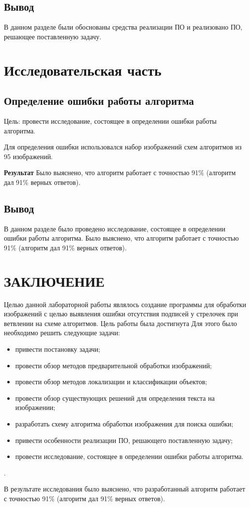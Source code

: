 \documentclass[12pt]{report}
\begin{document}
\section*{Вывод}
В данном разделе были обоснованы средства реализации ПО и реализовано ПО, решающее поставленную задачу.

\chapter{Исследовательская часть}

\section{Определение ошибки работы алгоритма}

Цель: провести исследование, состоящее в определении ошибки работы алгоритма.

Для определения ошибки использовался набор изображений схем алгоритмов из 95 изображений. 

\textbf{Результат}
Было выяснено, что алгоритм работает с точностью 91\% (алгоритм дал 91\% верных ответов).


\section*{Вывод}
В данном разделе было проведено исследование, состоящее в определении ошибки работы алгоритма. Было выяснено, что алгоритм работает с точностью 91\% (алгоритм дал 91\% верных ответов).

\chapter*{ЗАКЛЮЧЕНИЕ}
Целью данной лабораторной работы являлось создание программы для обработки изображений с целью выявления ошибки отсутствия подписей у стрелочек при ветвлении на схеме алгоритмов.
Цель работы была достигнута
Для этого было необходимо решить следующие задачи:
\begin{itemize}
    \item привести постановку задачи;
    \item провести обзор методов предварительной обработки изображений;
    \item провести обзор методов локализации и классификации объектов;
    \item провести обзор существующих решений для определения текста на изображении;
    \item разработать схему алгоритма обработки изображения для поиска ошибки;
    \item привести особенности реализации ПО, решающего поставленную задачу;
    \item провести исследование, состоящее в определении ошибки работы алгоритма.
\end{itemize}
.

В результате исследования было выяснено, что разработанный алгоритм работает с точностью 91\% (алгоритм дал 91\% верных ответов).

\printbibliography[title={СПИСОК ИСПОЛЬЗОВАННЫХ\\ ИСТОЧНИКОВ}]
\end{document}
